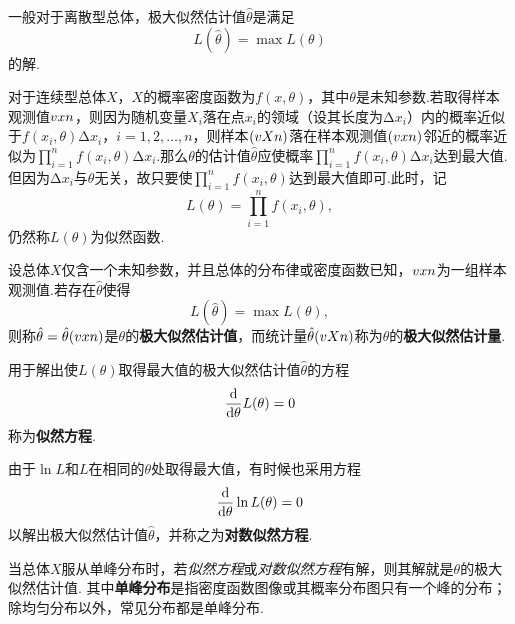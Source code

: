 一般对于离散型总体，极大似然估计值\(\hat{\theta}\)是满足\[
L(\hat{\theta}) = \max L(\theta)
\]的解.

对于连续型总体\(X\)，\(X\)的概率密度函数为\(f(x,\theta)\)，其中\(\theta\)是未知参数.若取得样本观测值\(v{x}{n}\)，则因为随机变量\(X_i\)落在点\(x_i\)的领域（设其长度为\(\increment x_i\)）内的概率近似于\(f(x_i,\theta) \increment x_i\)，\(i=1,2,\dotsc,n\)，则样本\((v{X}{n})\)落在样本观测值\((v{x}{n})\)邻近的概率近似为\(\prod\limits_{i=1}^n{f(x_i,\theta) \increment x_i}\).那么\(\theta\)的估计值\(\hat{\theta}\)应使概率\(\prod\limits_{i=1}^n{f(x_i,\theta) \increment x_i}\)达到最大值.但因为\(\increment x_i\)与\(\theta\)无关，故只要使\(\prod\limits_{i=1}^n{f(x_i,\theta)}\)达到最大值即可.此时，记\[
L(\theta) = \prod\limits_{i=1}^n{f(x_i,\theta)},
\]仍然称\(L(\theta)\)为似然函数.

\begin{definition}
设总体\(X\)仅含一个未知参数，并且总体的分布律或密度函数已知，\linebreak\(v{x}{n}\)为一组样本观测值.若存在\(\hat{\theta}\)使得\[
L(\hat{\theta}) = \max L(\theta),
\]则称\(\hat{\theta} = \hat{\theta}(v{x}{n})\)是\(\theta\)的\textbf{极大似然估计值}，而统计量\(\hat{\theta}(v{X}{n})\)称为\(\theta\)的\textbf{极大似然估计量}.
\end{definition}

\begin{definition}
用于解出使\(L(\theta)\)取得最大值的极大似然估计值\(\hat{\theta}\)的方程\[
\dv{\theta} L(\theta) = 0
\]称为\textbf{似然方程}.

由于\(\ln L\)和\(L\)在相同的\(\theta\)处取得最大值，有时候也采用方程\[
\dv{\theta} \ln L(\theta) = 0
\]以解出极大似然估计值\(\hat{\theta}\)，并称之为\textbf{对数似然方程}.
\end{definition}

\begin{theorem}
当总体\(X\)服从单峰分布时，若\emph{似然方程}或\emph{对数似然方程}有解，则其解就是\(\theta\)的极大似然估计值.
其中\textbf{单峰分布}是指密度函数图像或其概率分布图只有一个峰的分布；除均匀分布以外，常见分布都是单峰分布.
\end{theorem}

